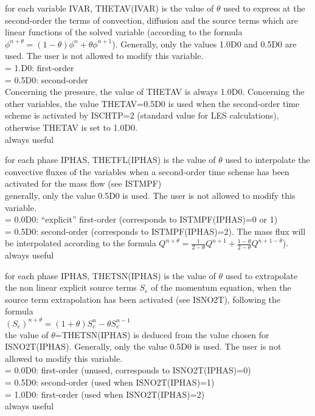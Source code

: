 {for each variable IVAR, THETAV(IVAR) is the value of $\theta$ used to
express at the second-order the terms of convection, diffusion and the
source terms which are linear functions of the solved variable
(according to the formula
$\phi^{n+\theta}=(1-\theta)\phi^n+\theta\phi^{n+1}$). Generally,
only the values 1.0D0 and 0.5D0 are used. The user is not allowed to modify
this variable.\\
\hspace*{1.3cm}= 1.D0: first-order \\
\hspace*{1.3cm}= 0.5D0: second-order \\
Concerning the pressure, the value of THETAV is always 1.0D0. Concerning
the other variables, the value THETAV=0.5D0 is used when the
second-order time scheme is activated by ISCHTP=2 (standard value for
LES calculations), otherwise THETAV is set to 1.0D0.\\
always useful}

{for each phase IPHAS, THETFL(IPHAS) is the value of $\theta$ used to
interpolate the convective fluxes of the variables when a second-order time
scheme has been activated for the mass flow (see ISTMPF)\\
generally, only the value 0.5D0 is used. The user is not allowed to
modify this variable.\\
\hspace*{1.3cm}= 0.0D0: ``explicit'' first-order (corresponds to
ISTMPF(IPHAS)=0 or 1)\\
\hspace*{1.3cm}= 0.5D0: second-order (corresponds to ISTMPF(IPHAS)=2). The mass
flux will be interpolated according to the formula
$Q^{n+\theta}=\frac{1}{2-\theta}Q^{n+1}+\frac{1-\theta}{2-\theta}Q^{n+1-\theta}$).\\
always useful}

{for each phase IPHAS, THETSN(IPHAS) is the value of $\theta$ used to
extrapolate the non linear explicit source terms $S_e$ of the momentum equation,
when the source term extrapolation has been activated (see ISNO2T),
following the formula\\
$(S_e)^{n+\theta}=(1+\theta)S_e^n-\theta S_e^{n-1}$\\
the value
of $\theta$=THETSN(IPHAS) is deduced from the value chosen for
ISNO2T(IPHAS). Generally, only the value 0.5D0 is used. The user is not
allowed to modify this variable.\\
\hspace*{1.3cm}= 0.0D0: first-order (unused, corresponds to ISNO2T(IPHAS)=0) \\
\hspace*{1.3cm}= 0.5D0: second-order (used when ISNO2T(IPHAS)=1) \\
\hspace*{1.3cm}= 1.0D0: first-order (used when ISNO2T(IPHAS)=2) \\
always useful}

